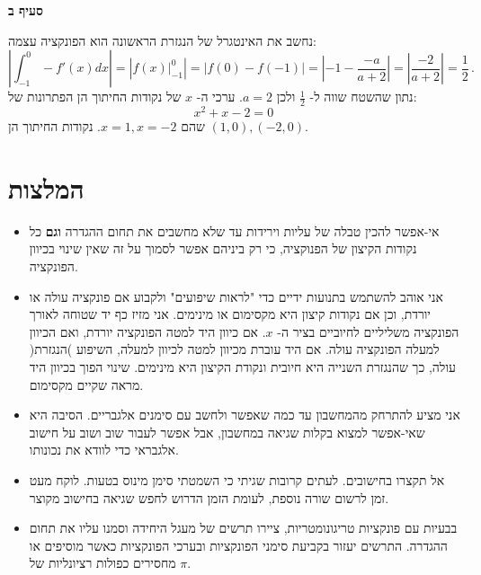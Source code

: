 \textbf{סעיף ב}

נחשב את האינטגרל של הנגזרת הראשונה הוא הפונקציה עצמה:
\[
\left|\int_{-1}^0 -f'(x) dx\right| = \left|\left.f(x)\right|_{-1}^0\right|=\left|f(0)-f(-1)\right|=\left|-1-\frac{-a}{a+2}\right|=\left|\frac{-2}{a+2}\right|=\frac{1}{2}\,.
\]
נתון שהשטח שווה ל-%
$\frac{1}{2}$
ולכן 
$a=2$.
ערכי ה-%
$x$
של נקודות החיתוך הן הפתרונות של:
\[
x^2+x-2=0\,
\]
שהם
$x=1,x=-2$.
נקודות החיתוך הן
$(1,0), (-2,0)$.


\np

\section{המלצות}

\begin{itemize}
\item
אי-אפשר להכין טבלה של עליות וירידות עד שלא מחשבים את תחום ההגדרה 
\textbf{וגם}
כל נקודות הקיצון של הפנוקציה, כי רק ביניהם אפשר לסמוך על זה שאין שינוי בכיוון הפונקציה.


\item
אני אוהב להשתמש בתנועות ידיים כדי "לראות שיפועים" ולקבוע אם פונקציה עולה או יורדת, וכן אם נקודות קיצון היא מקסימום או מינימים. אני מזיז כף יד שטוחה לאורך הפונקציה משליליים לחיוביים בציר ה-%
$x$.
אם כיוון היד למטה הפונקציה יורדת, ואם הכיוון למעלה הפונקציה עולה. אם היד עוברת מכיוון למטה לכיוון למעלה, השיפוע )הנגזרת( עולה, כך שהנגזרת השנייה היא חיובית ונקודת הקיצון היא מינימים. שינוי הפוך בכיוון היד מראה שקיים מקסימום.

\item
אני מציע להתרחק מהמחשבון עד כמה שאפשר ולחשב עם סימנים אלגבריים. הסיבה היא שאי-אפשר למצוא בקלות שגיאה במחשבון, אבל אפשר לעבור שוב ושוב על חישוב אלגבראי כדי לוודא את נכונותו. 

\item
אל תקצרו בחישובים. לעתים קרובות שגיתי כי השמטתי סימן מינוס בטעות. לוקח מעט זמן לרשום שורה נוספת, לעומת הזמן הדרוש לחפש שגיאה בחישוב מקוצר.

\item
בבעיות עם פונקציות טריגונומטריות, ציירו תרשים של מעגל היחידה וסמנו עליו את תחום ההגדרה. התרשים יעזור בקביעת סימני הפונקציות ובערכי הפונקציות כאשר מוסיפים או מחסירים כפולות רציונליות של 
$\pi$.
\end{itemize}


